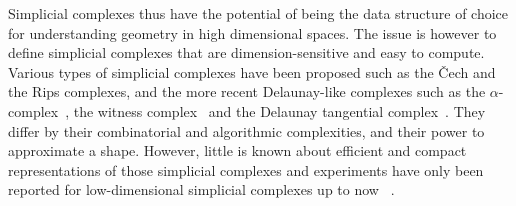 Simplicial complexes thus have the potential of being the data structure of choice for understanding geometry in high dimensional spaces. The issue is however to define simplicial complexes that are dimension-sensitive and easy to compute.  Various types of simplicial complexes have been proposed such as the \v{C}ech and the Rips complexes, and the more recent Delaunay-like complexes such as the $\alpha$-complex~\cite{eks-sspp-83,he-ubds-95}, the witness complex~\cite{deSilva2008,cds-tewc-2004} and the Delaunay tangential complex~\cite{geometrica-7142i}. They differ by their combinatorial and algorithmic complexities, and their power to approximate a shape. However, little is known about efficient and compact representations of those simplicial complexes and experiments have only been reported for low-dimensional simplicial complexes up to now ~\cite{rg-bptd-2008}.  











